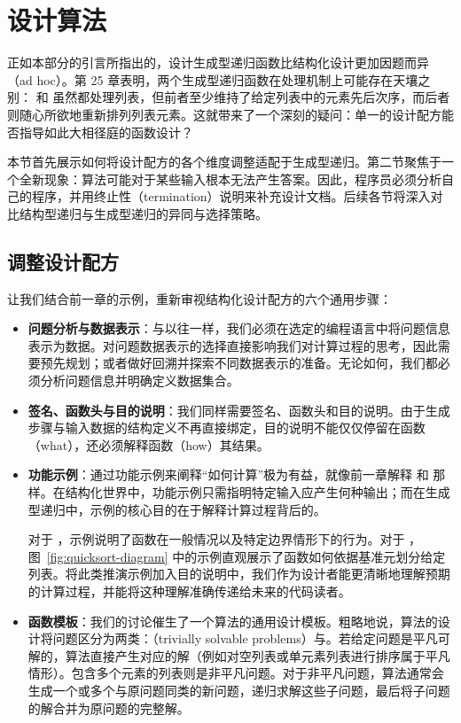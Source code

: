 
\chapter{设计算法}
\label{sec:ch26_algorithms}

正如本部分的引言所指出的，设计生成型递归函数比结构化设计更加因题而异（ad hoc）。第 25 章表明，两个生成型递归函数在处理机制上可能存在天壤之别： 和  虽然都处理列表，但前者至少维持了给定列表中的元素先后次序，而后者则随心所欲地重新排列列表元素。这就带来了一个深刻的疑问：单一的设计配方能否指导如此大相径庭的函数设计？

本节首先展示如何将设计配方的各个维度调整适配于生成型递归。第二节聚焦于一个全新现象：算法可能对于某些输入根本无法产生答案。因此，程序员必须分析自己的程序，并用终止性（termination）说明来补充设计文档。后续各节将深入对比结构型递归与生成型递归的异同与选择策略。

\section{调整设计配方}
\label{sec:26_1}

让我们结合前一章的示例，重新审视结构化设计配方的六个通用步骤：

\begin{itemize}
  \item \textbf{问题分析与数据表示}：与以往一样，我们必须在选定的编程语言中将问题信息表示为数据。对问题数据表示的选择直接影响我们对计算过程的思考，因此需要预先规划；或者做好回溯并探索不同数据表示的准备。无论如何，我们都必须分析问题信息并明确定义数据集合。
  \item \textbf{签名、函数头与目的说明}：我们同样需要签名、函数头和目的说明。由于生成步骤与输入数据的结构定义不再直接绑定，目的说明不能仅仅停留在函数（what），还必须解释函数（how）其结果。
  \item \textbf{功能示例}：通过功能示例来阐释“如何计算”极为有益，就像前一章解释  和  那样。在结构化世界中，功能示例只需指明特定输入应产生何种输出；而在生成型递归中，示例的核心目的在于解释计算过程背后的。
  
  对于 ，示例说明了函数在一般情况以及特定边界情形下的行为。对于 ，图~\ref{fig:quicksort-diagram} 中的示例直观展示了函数如何依据基准元划分给定列表。将此类推演示例加入目的说明中，我们作为设计者能更清晰地理解预期的计算过程，并能将这种理解准确传递给未来的代码读者。
  \item \textbf{函数模板}：我们的讨论催生了一个算法的通用设计模板。粗略地说，算法的设计将问题区分为两类：（trivially solvable problems）与。若给定问题是平凡可解的，算法直接产生对应的解（例如对空列表或单元素列表进行排序属于平凡情形）。包含多个元素的列表则是非平凡问题。对于非平凡问题，算法通常会生成一个或多个与原问题同类的新问题，递归求解这些子问题，最后将子问题的解合并为原问题的完整解。
\end{itemize}

